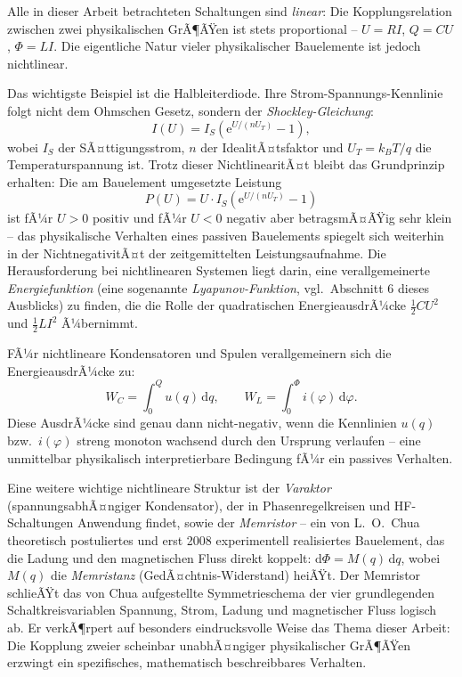 ﻿\documentclass[12pt, a4paper]{article}
\begin{document}
	Alle in dieser Arbeit betrachteten Schaltungen sind \textit{linear}: Die Kopplungsrelation zwischen zwei physikalischen GrÃ¶ÃŸen ist stets proportional -- $U = RI$, $Q = CU$, $\Phi = LI$. Die eigentliche Natur vieler physikalischer Bauelemente ist jedoch nichtlinear.

	Das wichtigste Beispiel ist die Halbleiterdiode. Ihre Strom-Spannungs-Kennlinie folgt nicht dem Ohmschen Gesetz, sondern der \textit{Shockley-Gleichung}:
	\begin{equation}
		I(U) = I_S \left(\mathrm{e}^{U/(n U_T)} - 1\right),
	\end{equation}
	wobei $I_S$ der SÃ¤ttigungsstrom, $n$ der IdealitÃ¤tsfaktor und $U_T = k_B T / q$ die Temperaturspannung ist. Trotz dieser NichtlinearitÃ¤t bleibt das Grundprinzip erhalten: Die am Bauelement umgesetzte Leistung
	\begin{equation}
		P(U) = U \cdot I_S \left(\mathrm{e}^{U/(n U_T)} - 1\right)
	\end{equation}
	ist fÃ¼r $U > 0$ positiv und fÃ¼r $U < 0$ negativ aber betragsmÃ¤ÃŸig sehr klein -- das physikalische Verhalten eines passiven Bauelements spiegelt sich weiterhin in der NichtnegativitÃ¤t der zeitgemittelten Leistungsaufnahme. Die Herausforderung bei nichtlinearen Systemen liegt darin, eine verallgemeinerte \textit{Energiefunktion} (eine sogenannte \textit{Lyapunov-Funktion}, vgl.\ Abschnitt 6 dieses Ausblicks) zu finden, die die Rolle der quadratischen EnergieausdrÃ¼cke $\frac{1}{2}CU^2$ und $\frac{1}{2}LI^2$ Ã¼bernimmt.

	FÃ¼r nichtlineare Kondensatoren und Spulen verallgemeinern sich die EnergieausdrÃ¼cke zu:
	\begin{equation}
		W_C = \int_0^Q u(q)\,\mathrm{d}q, \qquad W_L = \int_0^\Phi i(\varphi)\,\mathrm{d}\varphi.
	\end{equation}
	Diese AusdrÃ¼cke sind genau dann nicht-negativ, wenn die Kennlinien $u(q)$ bzw.\ $i(\varphi)$ streng monoton wachsend durch den Ursprung verlaufen -- eine unmittelbar physikalisch interpretierbare Bedingung fÃ¼r ein passives Verhalten.

	Eine weitere wichtige nichtlineare Struktur ist der \textit{Varaktor} (spannungsabhÃ¤ngiger Kondensator), der in Phasenregelkreisen und HF-Schaltungen Anwendung findet, sowie der \textit{Memristor} -- ein von L.~O.~Chua~\cite{chua1969} theoretisch postuliertes und erst 2008 experimentell realisiertes Bauelement, das die Ladung und den magnetischen Fluss direkt koppelt: $\mathrm{d}\Phi = M(q)\,\mathrm{d}q$, wobei $M(q)$ die \textit{Memristanz} (GedÃ¤chtnis-Widerstand) heiÃŸt. Der Memristor schlieÃŸt das von Chua aufgestellte Symmetrieschema der vier grundlegenden Schaltkreisvariablen Spannung, Strom, Ladung und magnetischer Fluss logisch ab. Er verkÃ¶rpert auf besonders eindrucksvolle Weise das Thema dieser Arbeit: Die Kopplung zweier scheinbar unabhÃ¤ngiger physikalischer GrÃ¶ÃŸen erzwingt ein spezifisches, mathematisch beschreibbares Verhalten.
\end{document}
